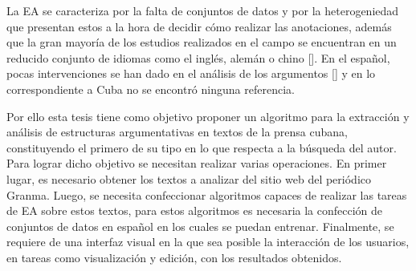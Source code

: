 
La EA se caracteriza por la falta de conjuntos de datos y 
por la heterogeniedad que presentan estos a la hora de decidir cómo realizar las 
anotaciones, además que la gran mayoría de los estudios realizados en el campo se encuentran en 
un reducido conjunto de idiomas como el inglés, alemán o chino [\cite{eger2018cross}]. 
En el español, pocas intervenciones se han dado en el análisis de los argumentos [\cite{esteve2020mineria}] y en 
lo correspondiente a Cuba no se encontró ninguna referencia. 


Por ello esta tesis tiene como objetivo proponer un algoritmo para 
la extracción y análisis de estructuras argumentativas en textos 
de la prensa cubana, constituyendo el primero de su tipo en lo que respecta a la búsqueda del autor. 
Para lograr dicho objetivo se necesitan realizar varias operaciones.
En primer lugar, es necesario obtener los textos a analizar del sitio 
web del periódico Granma. Luego, se necesita confeccionar algoritmos capaces de realizar las tareas 
de EA sobre estos textos, para estos algoritmos es necesaria la confección de conjuntos 
de datos en español en los cuales se puedan entrenar. Finalmente, se requiere de una interfaz visual 
en la que sea posible la interacción de los usuarios, en tareas como visualización y edición, 
con los resultados obtenidos. 

